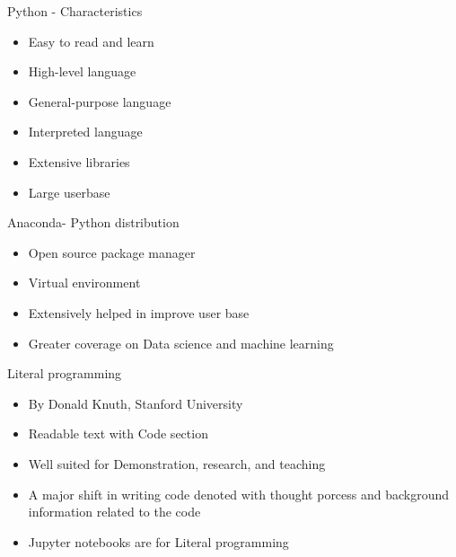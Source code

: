 \begin{frame}{Python - Characteristics}
	\begin{beamerboxesrounded}{}
		\begin{itemize}
			\item Easy to read and learn
			\item High-level language
			\item General-purpose language
			\item Interpreted language
			\item Extensive libraries
			\item Large userbase 
		\end{itemize}
	\end{beamerboxesrounded}
\end{frame}

\begin{frame}{Anaconda- Python distribution}
	\begin{beamerboxesrounded}{}
		\begin{itemize}
			\item Open source package manager
			\item Virtual environment 
			\item Extensively helped in improve user base
			\item Greater coverage on Data science and machine learning 
		\end{itemize}
	\end{beamerboxesrounded}
\end{frame}

\begin{frame}{Literal programming}
	\begin{beamerboxesrounded}{}
		\begin{itemize}
			\item By Donald Knuth, Stanford University
			\item Readable text with Code section
			\item Well suited for Demonstration, research, and teaching 
			\item A major shift in writing code denoted with thought porcess and background information related to the code 
			\item Jupyter notebooks are for Literal programming
		\end{itemize}
	\end{beamerboxesrounded}
\end{frame}

